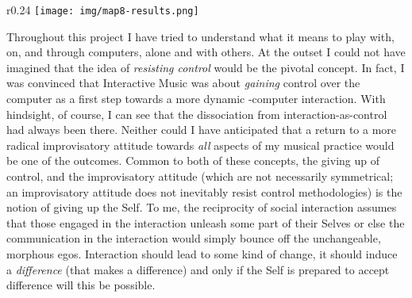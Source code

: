 

\begin{wrapfigure}{r}{0.24\linewidth}
\centering
\texttt{[image: img/map8-results.png]}
\end{wrapfigure}
Throughout this project I have tried to understand what it means to play with, on, and through computers, alone and with others. At the outset I could not have imagined that the idea of \emph{resisting control} would be the pivotal concept. In fact, I was convinced that Interactive Music was about \emph{gaining} control over the computer as a first step towards a more dynamic -computer interaction. With hindsight, of course, I can see that the dissociation from interaction-as-control had always been there. Neither could I have anticipated that a return to a more radical improvisatory attitude towards \emph{all} aspects of my musical practice would be one of the outcomes. Common to both of these concepts, the giving up of control, and the improvisatory attitude (which are not necessarily symmetrical; an improvisatory attitude does not inevitably resist control methodologies) is the notion of giving up the Self. To me, the reciprocity of social interaction assumes that those engaged in the interaction unleash some part of their Selves or else the communication in the interaction would simply bounce off the unchangeable, morphous egos. Interaction should lead to some kind of change, it should induce a \emph{difference} (that makes a difference) and only if the Self is prepared to accept difference will this be possible.

